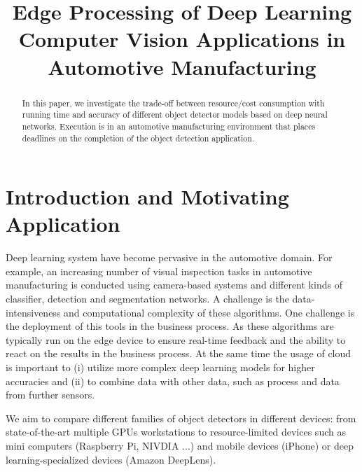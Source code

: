 \documentclass[conference]{IEEEtran}
\begin{document}
\title{Edge Processing of Deep Learning Computer Vision Applications in  Automotive Manufacturing}
%


\maketitle

\thispagestyle{plain}
\pagestyle{plain}



\begin{abstract}
In this paper, we investigate the trade-off between resource/cost consumption with running time and accuracy of different object detector models based on deep neural networks.
Execution is in an automotive manufacturing environment that places deadlines on the completion of the object detection application.  
\end{abstract}


\IEEEpeerreviewmaketitle

\nocite{*}

\section{Introduction and Motivating Application}

Deep learning system have become pervasive in the automotive domain. For example, an increasing number of visual inspection tasks in automotive manufacturing is conducted using camera-based systems and different kinds of classifier, detection and segmentation networks. A challenge is the data-intensiveness and computational complexity of these algorithms. One challenge is the deployment of this tools in the business process. As these algorithms are typically run on the edge device to ensure real-time feedback and the ability to react on the results in the business process. At the same time the usage of cloud is important to (i) utilize more complex deep learning models for higher accuracies and (ii) to combine data with other data, such as process and data from further sensors.


We aim to compare different families of object detectors in different devices: from state-of-the-art multiple GPUs workstations to resource-limited devices such as mini computers (Raspberry Pi, NIVDIA ...) and mobile devices (iPhone) or deep learning-specialized devices (Amazon DeepLens).
\end{document}
